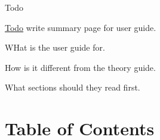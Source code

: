 \begin{DoxyRefDesc}{Todo}
\item[\hyperlink{todo__todo000014}{Todo}]write summary page for user guide.
\begin{DoxyItemize}
\item W\-Hat is the user guide for.
\item How is it different from the theory guide.
\item What sections should they read first.
\end{DoxyItemize}\end{DoxyRefDesc}


\section*{Table of Contents}